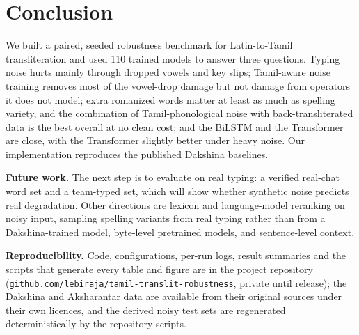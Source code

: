 \section{Conclusion}
We built a paired, seeded robustness benchmark for Latin-to-Tamil transliteration and used 110 trained models to answer three questions.
Typing noise hurts mainly through dropped vowels and key slips; Tamil-aware noise training removes most of the vowel-drop damage but not damage from operators it does not model; extra romanized words matter at least as much as spelling variety, and the combination of Tamil-phonological noise with back-transliterated data is the best overall at no clean cost; and the BiLSTM and the Transformer are close, with the Transformer slightly better under heavy noise.
Our implementation reproduces the published Dakshina baselines.

\textbf{Future work.}
The next step is to evaluate on real typing: a verified real-chat word set and a team-typed set, which will show whether synthetic noise predicts real degradation.
Other directions are lexicon and language-model reranking on noisy input, sampling spelling variants from real typing rather than from a Dakshina-trained model, byte-level pretrained models, and sentence-level context.

\textbf{Reproducibility.}
Code, configurations, per-run logs, result summaries and the scripts that generate every table and figure are in the project repository (\texttt{github.com/lebiraja/tamil-translit-robustness}, private until release); the Dakshina and Aksharantar data are available from their original sources under their own licences, and the derived noisy test sets are regenerated deterministically by the repository scripts.
